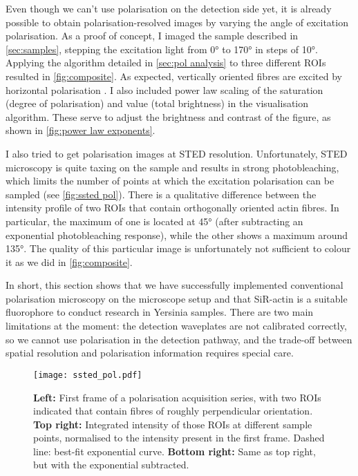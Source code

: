 Even though we can't use polarisation on the detection side yet, it is already possible to obtain polarisation-resolved images by varying the angle of excitation polarisation. As a proof of concept, I imaged the sample described in \autoref{sec:samples}, stepping the excitation light from \ang{0} to \ang{170} in steps of \ang{10}. Applying the algorithm detailed in \autoref{sec:pol analysis} to three different ROIs resulted in \autoref{fig:composite}. As expected, vertically oriented fibres are excited by horizontal polarisation \cite{Spira2017}.
I also included power law scaling of the saturation (degree of polarisation) and value (total brightness) in the visualisation algorithm. These serve to adjust the brightness and contrast of the figure, as shown in \autoref{fig:power law exponents}.

I also tried to get polarisation images at STED resolution. Unfortunately, STED microscopy is quite taxing on the sample and results in strong photobleaching, which limits the number of points at which the excitation polarisation can be sampled (see \autoref{fig:ssted pol}). There is a qualitative difference between the intensity profile of two ROIs that contain orthogonally oriented actin fibres. In particular, the maximum of one is located at \ang{45} (after subtracting an exponential photobleaching response), while the other shows a maximum around \ang{135}. The quality of this particular image is unfortunately not sufficient to colour it as we did in \autoref{fig:composite}.

In short, this section shows that we have successfully implemented conventional polarisation microscopy on the microscope setup and that SiR-actin is a suitable fluorophore to conduct research in Yersinia samples. There are two main limitations at the moment: the detection waveplates are not calibrated correctly, so we cannot use polarisation in the detection pathway, and the trade-off between spatial resolution and polarisation information requires special care.

\begin{figure}
	\centering
	\texttt{[image: ssted\_pol.pdf]}
	\caption{
		\textbf{Left:} First frame of a polarisation acquisition series, with two ROIs indicated that contain fibres of roughly perpendicular orientation. \textbf{Top right:} Integrated intensity of those ROIs at different sample points, normalised to the intensity present in the first frame. Dashed line: best-fit exponential curve. \textbf{Bottom right:} Same as top right, but with the exponential subtracted.
 	}
 	\label{fig:ssted pol}
\end{figure}

